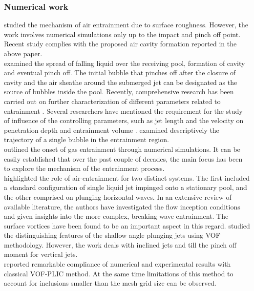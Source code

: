 \subsubsection{Numerical work}
\citet{Zhu2000} studied the mechanism of air entrainment due to surface roughness. However, the work involves numerical simulations only up to the impact and pinch off point. Recent study complies with the proposed air cavity formation reported in the above paper.\\
\citet{Kersten2003} examined the spread of falling liquid over the receiving pool, formation of cavity and eventual pinch off. The initial bubble that pinches off after the closure of cavity and the air sheathe around the submerged jet can be designated as the source of bubbles inside the pool. Recently, comprehensive research has been carried out on further characterization of different parameters related to entrainment \citep{Belden2012,Harby2014,Bagatur2014}. Several researchers have mentioned the requirement for the study of influence of the controlling parameters, such as jet length and the velocity on penetration depth and entrainment volume \citep{Qu2013}. \citet{Roy2013} examined descriptively the trajectory of a single bubble in the entrainment region.\\
\citet{Durve2012} outlined the onset of gas entrainment through numerical simulations. It can be easily established that over the past couple of decades, the main focus has been to explore the mechanism of the entrainment process.\\
\citet{kiger2012air} highlighted the role of air-entrainment for two distinct systems. The first included a standard configuration of single liquid jet impinged onto a stationary pool, and the other comprised on plunging horizontal waves. In an extensive review of available literature, the authors have investigated the flow inception conditions and given insights into the more complex, breaking wave entrainment. The surface vortices have been found to be an important aspect in this regard.
\citet{Deshpande2013} studied the distinguishing features of the shallow angle plunging jets using VOF methodology. However, the work deals with inclined jets and till the pinch off moment for vertical jets.\\
\citet{Brouilliot2013} reported remarkable compliance of numerical and experimental results with classical VOF-PLIC method. At the same time limitations of this method to account for inclusions smaller than the mesh grid size can be observed.\\
